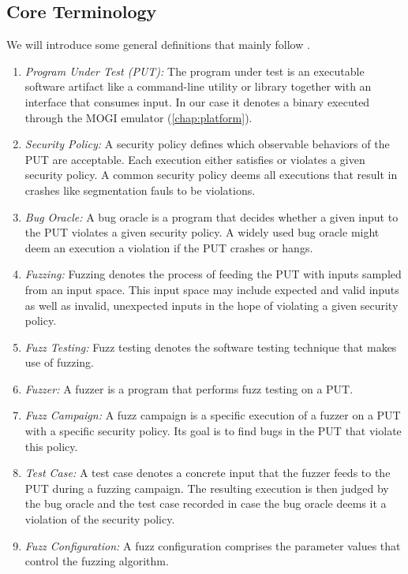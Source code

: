 \subsection{Core Terminology\label{sec:fuzzing-definitions}}

We will introduce some general definitions that mainly follow \textcite{manes_art_2019}.

\begin{enumerate}
  \item \emph{Program Under Test (PUT):}
    The program under test is an executable software artifact like a command-line utility
    or library together with an interface that consumes input. In our case it denotes
    a binary executed through the MOGI emulator (\cref{chap:platform}).

  \item \emph{Security Policy:}
    A security policy defines which observable behaviors of the PUT are acceptable.
    Each execution either satisfies or violates a given security policy. A common
    security policy deems all executions that result in crashes like segmentation
    fauls to be violations.

  \item \emph{Bug Oracle:}
    A bug oracle is a program that decides whether a given input to the PUT violates
    a given security policy. A widely used bug oracle might deem an execution
    a violation if the PUT crashes or hangs.

  \item \emph{Fuzzing:}
    Fuzzing denotes the process of feeding the PUT with inputs sampled from an input space.
    This input space may include expected and valid inputs as well as invalid, unexpected
    inputs in the hope of violating a given security policy.

  \item \emph{Fuzz Testing:}
    Fuzz testing denotes the software testing technique that makes use of fuzzing.

  \item \emph{Fuzzer:}
    A fuzzer is a program that performs fuzz testing on a PUT.

  \item \emph{Fuzz Campaign:}
    A fuzz campaign is a specific execution of a fuzzer on a PUT with a specific
    security policy. Its goal is to find bugs in the PUT that violate this policy.

  \item \emph{Test Case:}
    A test case denotes a concrete input that the fuzzer feeds to the PUT during
    a fuzzing campaign. The resulting execution is then judged by the bug oracle
    and the test case recorded in case the bug oracle deems it a violation of the
    security policy.

  \item \emph{Fuzz Configuration:}
    A fuzz configuration comprises the parameter values that control the fuzzing
    algorithm.
\end{enumerate}

